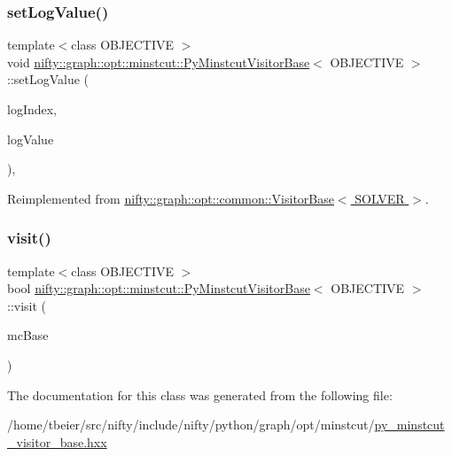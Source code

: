 \subsubsection{\texorpdfstring{set\+Log\+Value()}{setLogValue()}}
{\footnotesize\ttfamily template$<$class O\+B\+J\+E\+C\+T\+I\+VE $>$ \\
void \hyperlink{classnifty_1_1graph_1_1opt_1_1minstcut_1_1PyMinstcutVisitorBase}{nifty\+::graph\+::opt\+::minstcut\+::\+Py\+Minstcut\+Visitor\+Base}$<$ O\+B\+J\+E\+C\+T\+I\+VE $>$\+::set\+Log\+Value (\begin{DoxyParamCaption}\item[{const std\+::size\+\_\+t}]{log\+Index,  }\item[{double}]{log\+Value }\end{DoxyParamCaption})\hspace{0.3cm}{\ttfamily [inline]}, {\ttfamily [virtual]}}



Reimplemented from \hyperlink{classnifty_1_1graph_1_1opt_1_1common_1_1VisitorBase_a41efc013731cca97176a61be58db0094}{nifty\+::graph\+::opt\+::common\+::\+Visitor\+Base$<$ S\+O\+L\+V\+E\+R $>$}.

\mbox{\label{classnifty_1_1graph_1_1opt_1_1minstcut_1_1PyMinstcutVisitorBase_ad457515b2b1c62906645c7687be6bc8d}} 
\subsubsection{\texorpdfstring{visit()}{visit()}}
{\footnotesize\ttfamily template$<$class O\+B\+J\+E\+C\+T\+I\+VE $>$ \\
bool \hyperlink{classnifty_1_1graph_1_1opt_1_1minstcut_1_1PyMinstcutVisitorBase}{nifty\+::graph\+::opt\+::minstcut\+::\+Py\+Minstcut\+Visitor\+Base}$<$ O\+B\+J\+E\+C\+T\+I\+VE $>$\+::visit (\begin{DoxyParamCaption}\item[{\hyperlink{classnifty_1_1graph_1_1opt_1_1minstcut_1_1PyMinstcutVisitorBase_a77d46bc1780dd5d3aafdb832f529859b}{Mc\+Base} $\ast$}]{mc\+Base }\end{DoxyParamCaption})\hspace{0.3cm}{\ttfamily [inline]}}



The documentation for this class was generated from the following file\+:\begin{DoxyCompactItemize}
\item 
/home/tbeier/src/nifty/include/nifty/python/graph/opt/minstcut/\hyperlink{py__minstcut__visitor__base_8hxx}{py\+\_\+minstcut\+\_\+visitor\+\_\+base.\+hxx}\end{DoxyCompactItemize}
